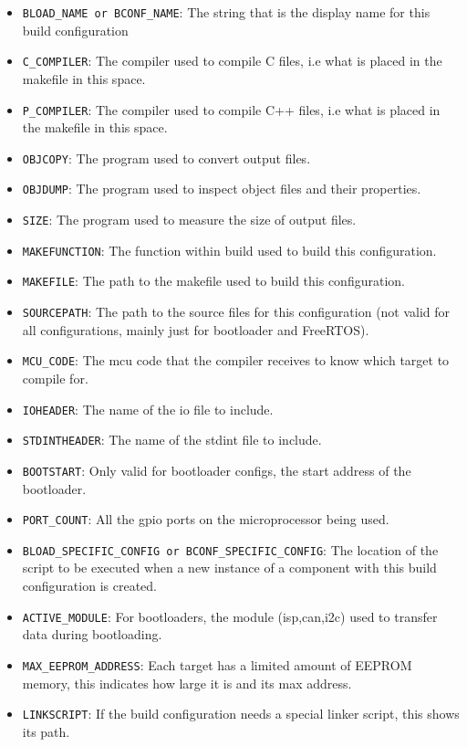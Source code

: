 \documentclass[a4paper, oneside, 11pt, titlepage, onecolumn, openright]{report}
\begin{document}
\begin{itemize}
\item \texttt{BLOAD\_NAME or BCONF\_NAME}: The string that is the display name for this build configuration
\item \texttt{C\_COMPILER}: The compiler used to compile C files, i.e what is placed in the makefile in this space.
\item \texttt{P\_COMPILER}: The compiler used to compile C++ files, i.e what is placed in the makefile in this space.
\item \texttt{OBJCOPY}: The program used to convert output files.
\item \texttt{OBJDUMP}: The program used to inspect object files and their properties.
\item \texttt{SIZE}: The program used to measure the size of output files.
\item \texttt{MAKEFUNCTION}: The function within build used to build this configuration.
\item \texttt{MAKEFILE}: The path to the makefile used to build this configuration.
\item \texttt{SOURCEPATH}: The path to the source files for this configuration (not valid for all configurations, mainly just for bootloader and FreeRTOS).
\item \texttt{MCU\_CODE}: The mcu code that the compiler receives to know which target to compile for.
\item \texttt{IOHEADER}: The name of the io file to include.
\item \texttt{STDINTHEADER}: The name of the stdint file to include.
\item \texttt{BOOTSTART}: Only valid for bootloader configs, the start address of the bootloader.
\item \texttt{PORT\_COUNT}: All the gpio ports on the microprocessor being used.
\item \texttt{BLOAD\_SPECIFIC\_CONFIG or BCONF\_SPECIFIC\_CONFIG}: The location of the script to be executed when a new instance of a component with this build configuration is created.
\item \texttt{ACTIVE\_MODULE}: For bootloaders, the module (isp,can,i2c) used to transfer data during bootloading.
\item \texttt{MAX\_EEPROM\_ADDRESS}: Each target has a limited amount of EEPROM memory, this indicates how large it is and its max address.
\item \texttt{LINKSCRIPT}: If the build configuration needs a special linker script, this shows its path.

\end{itemize}
\end{document}

